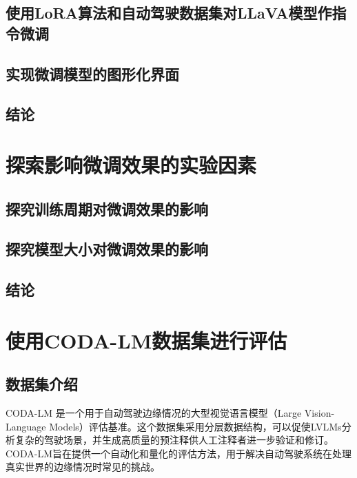 \documentclass[
    linespread = 1.25
]{ctexart}
\begin{document}

\subsection{使用LoRA算法和自动驾驶数据集对LLaVA模型作指令微调}

\subsection{实现微调模型的图形化界面}

\subsection{结论}

\section{探索影响微调效果的实验因素}

\subsection{探究训练周期对微调效果的影响}

\subsection{探究模型大小对微调效果的影响}

\subsection{结论}

\section{使用CODA-LM数据集进行评估}
\subsection{数据集介绍}
CODA-LM 是一个用于自动驾驶边缘情况的大型视觉语言模型（Large Vision-Language Models）评估基准。这个数据集采用分层数据结构，可以促使LVLMs分析复杂的驾驶场景，并生成高质量的预注释供人工注释者进一步验证和修订。CODA-LM旨在提供一个自动化和量化的评估方法，用于解决自动驾驶系统在处理真实世界的边缘情况时常见的挑战。
\end{document}
